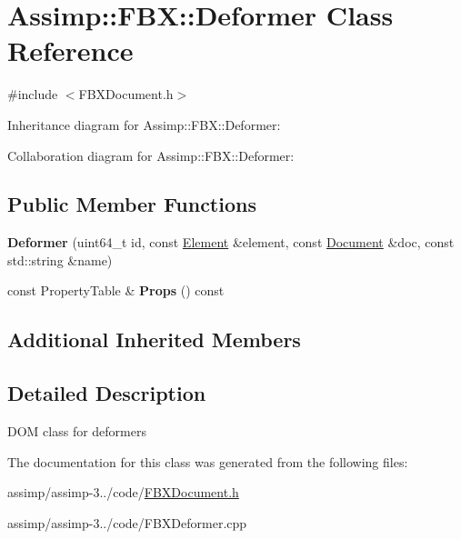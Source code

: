 \hypertarget{class_assimp_1_1_f_b_x_1_1_deformer}{\section{Assimp\+:\+:F\+B\+X\+:\+:Deformer Class Reference}
\label{class_assimp_1_1_f_b_x_1_1_deformer}
}


{\ttfamily \#include $<$F\+B\+X\+Document.\+h$>$}



Inheritance diagram for Assimp\+:\+:F\+B\+X\+:\+:Deformer\+:


Collaboration diagram for Assimp\+:\+:F\+B\+X\+:\+:Deformer\+:
\subsection*{Public Member Functions}
\begin{DoxyCompactItemize}
\item 
\hypertarget{class_assimp_1_1_f_b_x_1_1_deformer_af4064cbe47a0deeaeeb4d5f18acb9814}{{\bfseries Deformer} (uint64\+\_\+t id, const \hyperlink{class_assimp_1_1_f_b_x_1_1_element}{Element} \&element, const \hyperlink{class_assimp_1_1_f_b_x_1_1_document}{Document} \&doc, const std\+::string \&name)}\label{class_assimp_1_1_f_b_x_1_1_deformer_af4064cbe47a0deeaeeb4d5f18acb9814}

\item 
\hypertarget{class_assimp_1_1_f_b_x_1_1_deformer_a6a140855bff9aeeb675f4f1546afa7c7}{const Property\+Table \& {\bfseries Props} () const }\label{class_assimp_1_1_f_b_x_1_1_deformer_a6a140855bff9aeeb675f4f1546afa7c7}

\end{DoxyCompactItemize}
\subsection*{Additional Inherited Members}


\subsection{Detailed Description}
D\+O\+M class for deformers 

The documentation for this class was generated from the following files\+:\begin{DoxyCompactItemize}
\item 
assimp/assimp-\/3../code/\hyperlink{_f_b_x_document_8h}{F\+B\+X\+Document.\+h}\item 
assimp/assimp-\/3../code/F\+B\+X\+Deformer.\+cpp\end{DoxyCompactItemize}
